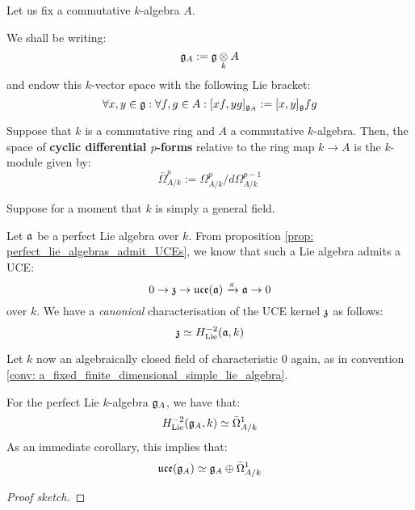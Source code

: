         \begin{convention}
            Let us fix a commutative $k$-algebra $A$.

            We shall be writing:
                $$\g_A := \g \tensor_k A$$
            and endow this $k$-vector space with the following Lie bracket:
                $$\forall x, y \in \mathfrak{g}: \forall f, g \in A: [x f, y g]_{\mathfrak{g}_A} := [x, y]_{\mathfrak{g}} fg$$
        \end{convention}

        \begin{definition}
            Suppose that $k$ is a commutative ring and $A$ a commutative $k$-algebra. Then, the space of \textbf{cyclic differential $p$-forms} relative to the ring map $k \to A$ is the $k$-module given by:
                $$\bar{\Omega}^p_{A/k} := \Omega^p_{A/k}/d\Omega^{p - 1}_{A/k}$$
        \end{definition}
        \begin{lemma} \label{lemma: cyclic_de_rham_complexes}
            
        \end{lemma}

        \begin{lemma}[$H^{-2}_{\Lie}$ = kernels of UCEs] \label{lemma: kenel_of_UCEs_of_perfect_lie_algebras_is_2nd_homology}
            Suppose for a moment that $k$ is simply a general field.

            Let $\mathfrak{a}$ be a perfect Lie algebra over $k$. From proposition \ref{prop: perfect_lie_algebras_admit_UCEs}, we know that such a Lie algebra admits a UCE:
                $$0 \to \mathfrak{z} \to \mathfrak{uce}(\mathfrak{a}) \xrightarrow[]{\pi} \mathfrak{a} \to 0$$
            over $k$. We have a \textit{canonical} characterisation of the UCE kernel $\mathfrak{z}$ as follows:
                $$\mathfrak{z} \simeq H^{-2}_{\mathrm{Lie}}(\mathfrak{a}, k)$$
        \end{lemma}
        \begin{theorem} \label{theorem: kassel_realisation}
            \cite[Corollary 3.5]{kassel_universal_central_extensions_of_lie_algebras} Let $k$ now an algebraically closed field of characteristic $0$ again, as in convention \ref{conv: a_fixed_finite_dimensional_simple_lie_algebra}. 

            For the perfect Lie $k$-algebra $\mathfrak{g}_A$, we have that:
                $$H^{-2}_{\mathrm{Lie}}(\mathfrak{g}_A, k) \simeq \bar{\Omega}^1_{A/k}$$
            As an immediate corollary, this implies that:
                $$\mathfrak{uce}(\mathfrak{g}_A) \simeq \mathfrak{g}_A \oplus \bar{\Omega}^1_{A/k}$$
        \end{theorem}
            \begin{proof}[Proof sketch]
                
            \end{proof}